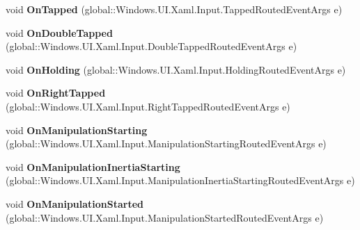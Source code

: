 \begin{DoxyCompactItemize}
void {\bfseries On\+Tapped} (global\+::\+Windows.\+U\+I.\+Xaml.\+Input.\+Tapped\+Routed\+Event\+Args e)
\item 
\mbox{\label{interface_windows_1_1_u_i_1_1_xaml_1_1_controls_1_1_i_control_overrides_a5a5f4e8f42a2fe161802c62c49b6876c}} 
void {\bfseries On\+Double\+Tapped} (global\+::\+Windows.\+U\+I.\+Xaml.\+Input.\+Double\+Tapped\+Routed\+Event\+Args e)
\item 
\mbox{\label{interface_windows_1_1_u_i_1_1_xaml_1_1_controls_1_1_i_control_overrides_a92652b416b1ff3a471b4cf7226c1f60f}} 
void {\bfseries On\+Holding} (global\+::\+Windows.\+U\+I.\+Xaml.\+Input.\+Holding\+Routed\+Event\+Args e)
\item 
\mbox{\label{interface_windows_1_1_u_i_1_1_xaml_1_1_controls_1_1_i_control_overrides_a5fbc80a16d3e6c89a86a5b99d3cca69f}} 
void {\bfseries On\+Right\+Tapped} (global\+::\+Windows.\+U\+I.\+Xaml.\+Input.\+Right\+Tapped\+Routed\+Event\+Args e)
\item 
\mbox{\label{interface_windows_1_1_u_i_1_1_xaml_1_1_controls_1_1_i_control_overrides_aa77c2f27ff19f19ddb9d11c56eb88ecf}} 
void {\bfseries On\+Manipulation\+Starting} (global\+::\+Windows.\+U\+I.\+Xaml.\+Input.\+Manipulation\+Starting\+Routed\+Event\+Args e)
\item 
\mbox{\label{interface_windows_1_1_u_i_1_1_xaml_1_1_controls_1_1_i_control_overrides_a21b1d1b2b1ecdec91300370cf68756eb}} 
void {\bfseries On\+Manipulation\+Inertia\+Starting} (global\+::\+Windows.\+U\+I.\+Xaml.\+Input.\+Manipulation\+Inertia\+Starting\+Routed\+Event\+Args e)
\item 
\mbox{\label{interface_windows_1_1_u_i_1_1_xaml_1_1_controls_1_1_i_control_overrides_ac3442eba714609f27fe4dd677f6f69cf}} 
void {\bfseries On\+Manipulation\+Started} (global\+::\+Windows.\+U\+I.\+Xaml.\+Input.\+Manipulation\+Started\+Routed\+Event\+Args e)

\end{DoxyCompactItemize}
